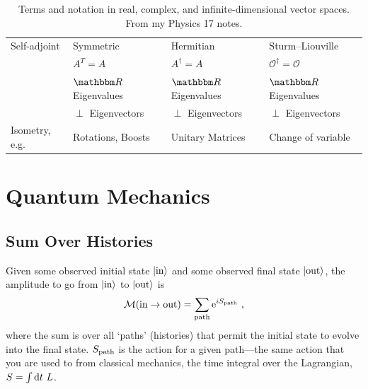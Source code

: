 \documentclass[12pt, oneside]{report}    %
\let\oldsection\section
\def\section{%
  \setcounter{sidenote}{1}%
  \oldsection
}
\begin{document}
\begin{subappendices}
\begin{table}
\begin{tabular}{ @{} llll @{} }
        Self-adjoint
            & Symmetric
            & Hermitian
            & Sturm--Liouville
        \\
            & $A^T = A$
            & $A^\dag = A$
            & $\mathcal O^\dag = \mathcal O$
        \\
            & $\RR$ Eigenvalues
            & $\RR$ Eigenvalues
            & $\RR$ Eigenvalues
        \\
            & $\perp$ Eigenvectors
            & $\perp$ Eigenvectors
            & $\perp$ Eigenvectors
        \\
        Isometry, e.g.
            & Rotations, Boosts
            & Unitary Matrices
            & Change of variable
        \\ \bottomrule
    \end{tabular}
    \caption{
        Terms and notation in real, complex, and infinite-dimensional vector spaces. From my Physics 17 notes.
        \label{table:vectors:conventions}
  }
\end{table}



\end{subappendices}




\chapter{Quantum Mechanics}

\section{Sum Over Histories}


\begin{newrule}
Given some observed initial state $\left|\textnormal{in}\right\rangle$ and some observed final state $\left|\textnormal{out}\right\rangle$, the amplitude to go from $\left|\textnormal{in}\right\rangle$ to $\left|\textnormal{out}\right\rangle$ is
\begin{align}
    \mathcal M(\textnormal{in}\to\textnormal{out})= 
    \sum_\textnormal{path} \operatorname{e}^{iS_\textnormal{path}} \ ,
\end{align}
where the sum is over all `paths' (histories) that permit the initial state to evolve into the final state. $S_\textnormal{path}$ is the action for a given path---the same action that you are used to from classical mechanics, the time integral over the Lagrangian, $S= \int \operatorname{d}\mkern-3mu^{}\mkern-1mu{t}\,\, L$.
\end{newrule}
\end{document}
